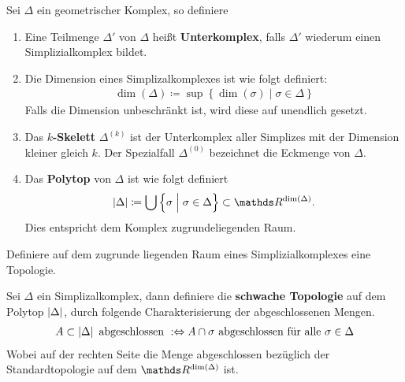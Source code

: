 \begin{Def}
  Sei $\Delta$ ein geometrischer Komplex, so definiere
  \begin{enumerate}[(1)]
  \item Eine Teilmenge $\Delta'$ von $\Delta$ heißt
    \textbf{Unterkomplex}, falls $\Delta'$ wiederum einen
    Simplizialkomplex bildet.
  \item Die Dimension eines Simplizalkomplexes ist wie folgt
    definiert:
    \begin{gather*}
      \dim(\Delta) \coloneqq \sup \left\{ \dim(\sigma) \; \Big| \;
        \sigma \in \Delta \right\}
    \end{gather*}
    Falls die Dimension unbeschränkt ist, wird diese auf unendlich
    gesetzt.
  \item Das \textbf{$k$-Skelett} $\Delta^{(k)}$ ist der Unterkomplex
    aller Simplizes mit der Dimension kleiner gleich $k$. Der
    Spezialfall $\Delta^{(0)}$ bezeichnet die Eckmenge von $\Delta$.
  \item Das \textbf{Polytop} von $\Delta$ ist wie folgt definiert
    \begin{gather*}
      |\Delta| \coloneqq \bigcup \left\{ \sigma \; \Big| \; \sigma \in
        \Delta \right\} \subset \R^{\dim(\Delta)}.
    \end{gather*}
    Dies entspricht dem Komplex zugrundeliegenden Raum.
	\end{enumerate}
\end{Def}



Definiere auf dem zugrunde liegenden Raum eines Simplizialkomplexes eine 
Topologie.

\begin{Def}
	Sei $\Delta$ ein Simplizalkomplex, dann definiere die
	\textbf{schwache Topologie} auf dem Polytop $\left| \Delta \right|$,
	durch folgende Charakterisierung der abgeschlossenen Mengen.
	\begin{gather*}
          A \subset \left| \Delta \right| \text{ abgeschlossen }
          :\Leftrightarrow A \cap \sigma \text{ abgeschlossen für alle
          } \sigma \in \Delta
	\end{gather*}
	Wobei auf der rechten Seite die Menge abgeschlossen bezüglich der
	Standardtopologie auf dem $\R^{\dim(\Delta)}$ ist.
\end{Def}

